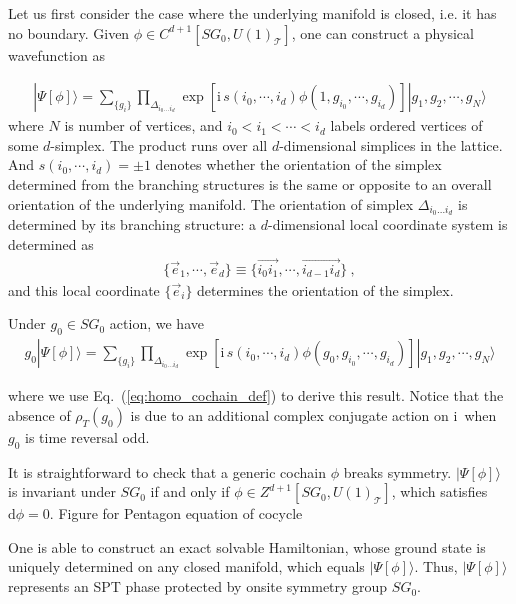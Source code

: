 \documentclass[%
  reprint,
  amsmath,amssymb,
  aps,pra,
]{revtex4-1}
\newcommand{\dd}{\mathrm{d}} %
\newcommand{\ii}{\mathrm{i}\,} %
\newcommand{\TT}{\mathcal{T}} %
\begin{document}
Let us first consider the case where the underlying manifold is closed, i.e. it has no boundary.
Given $\phi\in C^{d+1}[SG_0,U(1)_\TT]$, one can construct a physical wavefunction as
\begin{widetext}
  \begin{align}
    |\Psi[\phi]\rangle=\sum_{\{g_i\}}\prod_{\Delta_{i_0\ldots i_{d}}}\exp\left[ \ii s(i_0,\cdots,i_{d})\phi(1,g_{i_0},\cdots,g_{i_{d}})\right]|g_1,g_2,\cdots,g_N\rangle
    \label{eq:wf_from_cochain}
  \end{align}
  where $N$ is number of vertices, and $i_0<i_1<\cdots<i_d$ labels ordered vertices of some $d$-simplex.
  The product runs over all $d$-dimensional simplices in the lattice.
  And $s(i_0,\cdots,i_{d})=\pm1$ denotes whether the orientation of the simplex determined from the branching structures is the same or opposite to an overall orientation of the underlying manifold.
  The orientation of simplex $\Delta_{i_0\ldots i_d}$ is determined by its branching structure: a $d$-dimensional local coordinate system is determined as
  \begin{align}
    \{\vec{e}_1,\cdots,\vec{e}_d\}\equiv\{\overrightarrow{i_0i_1},\cdots,\overrightarrow{i_{d-1}i_{d}}\}~,
    \label{eq:branch_local_coord}
  \end{align}
  and this local coordinate $\{\vec{e}_i\}$ determines the orientation of the simplex.

  Under $g_0\in SG_0$ action, we have
  \begin{align}
    g_0|\Psi[\phi]\rangle=\sum_{\{g_i\}}\prod_{\Delta_{i_0\ldots i_{d}}}\exp\left[ \ii s(i_0,\cdots,i_{d})\phi(g_0,g_{i_0},\cdots,g_{i_{d}})\right]|g_1,g_2,\cdots,g_N\rangle
    \label{eq:sym_action_wf_from_cochain}
  \end{align}
\end{widetext}
where we use Eq.~(\ref{eq:homo_cochain_def}) to derive this result.
Notice that the absence of $\rho_T(g_0)$ is due to an additional complex conjugate action on $\ii$ when $g_0$ is time reversal odd.

It is straightforward to check that a generic cochain $\phi$ breaks symmetry. 
$|\Psi[\phi]\rangle$ is invariant under $SG_0$ if and only if $\phi\in Z^{d+1}[SG_0,U(1)_\TT]$, which satisfies $\dd\phi=0$. 
{\color{red} Figure for Pentagon equation of cocycle}

One is able to construct an exact solvable Hamiltonian, whose ground state is uniquely determined on any closed manifold, which equals $|\Psi[\phi]\rangle$.
Thus, $|\Psi[\phi]\rangle$ represents an SPT phase protected by onsite symmetry group $SG_0$.
\end{document}
